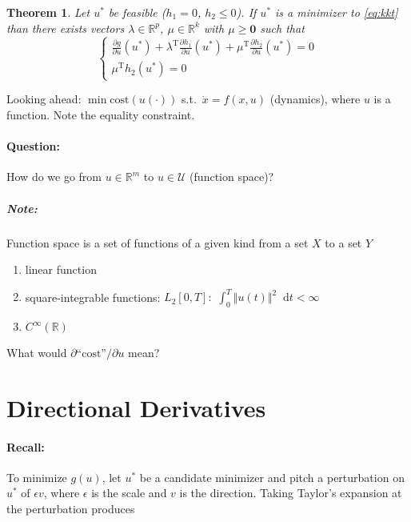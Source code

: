 \documentclass[letterpaper,12pt,titlepage]{report}
\newcommand*\dif{\mathop{}\!\mathrm{d}}
\newcommand{\trans}{^\text{T}}
\newcommand*\pder[2]{\frac{\partial #1}{\partial #2}}
\newcommand*\R{\mathbb{R}}
\theoremstyle{plain}
\newtheorem*{thm}{Theorem}
\theoremstyle{definition}
\begin{document}
\begin{thm}
  Let $u^*$ be feasible ($h_1=0$, $h_2\le0$). If $u^*$ is a minimizer to \eqref{eq:kkt} than there exists vectors $\lambda\in\R^p$, $\mu\in\R^k$ with $\mu\ge\bm 0$ such that
  \[ \begin{cases}
      \displaystyle \pder{g}{u}(u^*) + \lambda\trans \pder{h_1}{u}(u^*) + \mu\trans \pder{h_2}{u}(u^*) = 0 \\[1ex]
      \mu\trans h_2(u^*) = 0
    \end{cases} \]
\end{thm}

Looking ahead: $\min \text{cost}(u(\cdot))$ s.t.\ $\dot x = f(x,u)$ (dynamics), where $u$ is a function. Note the equality constraint.

\paragraph{Question:} How do we go from $u\in\R^m$ to $u\in\mathcal U$ (function space)?
\subparagraph{Note:} Function space is a set of functions of a given kind from a set $X$ to a set $Y$
\begin{enumerate}
\item linear function
\item square-integrable functions: $L_2[0,T]:$ $\int_0^T \Vert u(t)\Vert^2 \dif t < \infty$
\item $C^\infty (\R)$
\end{enumerate}
What would $\partial \text{``cost''}/\partial u$ mean?

\section{Directional Derivatives}
\paragraph{Recall:} To minimize $g(u)$, let $u^*$ be a candidate minimizer and pitch a perturbation on $u^*$ of $\epsilon v$, where $\epsilon$ is the scale and $v$ is the direction. Taking Taylor's expansion at the perturbation produces

\begin{center}
\end{center}
\end{document}

